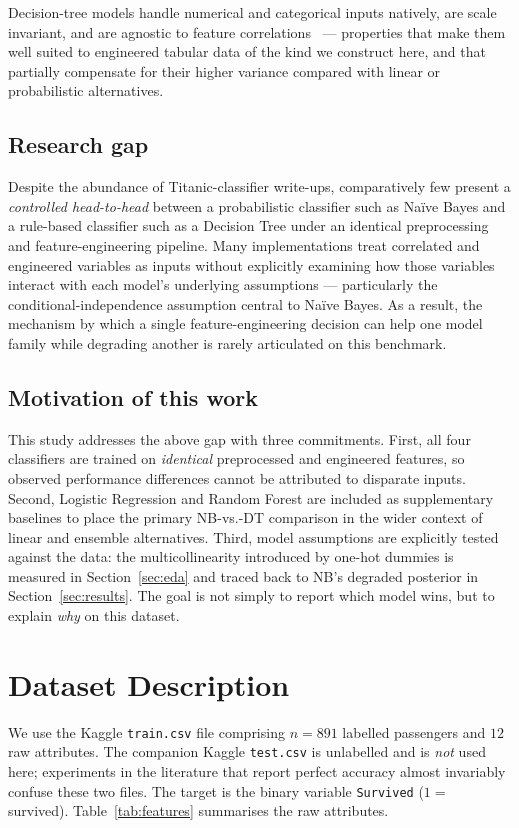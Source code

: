 \documentclass[10pt,a4paper,twocolumn]{article}
\begin{document}
Decision-tree models handle numerical and categorical inputs natively, are scale
invariant, and are agnostic to feature correlations~\cite{han2011data} --- properties
that make them well suited to engineered tabular data of the kind we construct here, and
that partially compensate for their higher variance compared with linear or
probabilistic alternatives.

\subsection{Research gap}
Despite the abundance of Titanic-classifier write-ups, comparatively few present a
\emph{controlled head-to-head} between a probabilistic classifier such as Na\"ive Bayes
and a rule-based classifier such as a Decision Tree under an identical preprocessing
and feature-engineering pipeline. Many implementations treat correlated and engineered
variables as inputs without explicitly examining how those variables interact with each
model's underlying assumptions --- particularly the conditional-independence assumption
central to Na\"ive Bayes. As a result, the mechanism by which a single
feature-engineering decision can help one model family while degrading another is
rarely articulated on this benchmark.

\subsection{Motivation of this work}
This study addresses the above gap with three commitments. First, all four classifiers
are trained on \emph{identical} preprocessed and engineered features, so observed
performance differences cannot be attributed to disparate inputs. Second, Logistic
Regression and Random Forest are included as supplementary baselines to place the
primary NB-vs.-DT comparison in the wider context of linear and ensemble alternatives.
Third, model assumptions are explicitly tested against the data: the multicollinearity
introduced by one-hot dummies is measured in Section~\ref{sec:eda} and traced back to
NB's degraded posterior in Section~\ref{sec:results}. The goal is not simply to report
which model wins, but to explain \emph{why} on this dataset.

\section{Dataset Description}\label{sec:dataset}
We use the Kaggle \texttt{train.csv} file comprising $n=891$ labelled passengers and $12$
raw attributes. The companion Kaggle \texttt{test.csv} is unlabelled and is \emph{not}
used here; experiments in the literature that report perfect accuracy almost invariably
confuse these two files. The target is the binary variable \texttt{Survived} ($1 =$
survived). Table~\ref{tab:features} summarises the raw attributes.
\end{document}
